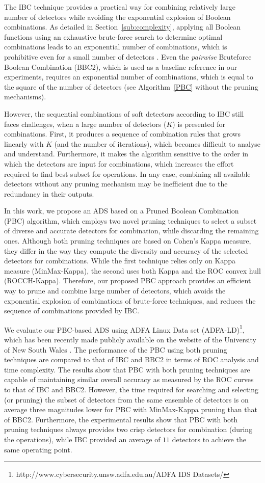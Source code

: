 The IBC technique provides a practical way for combining relatively large number of detectors while avoiding the exponential explosion of Boolean combinations.
As detailed in Section~\ref{sub:complexity}, applying all Boolean functions using an exhaustive brute-force search to determine optimal combinations leads to an exponential number of combinations, which is prohibitive even for a small number of detectors \cite{Barreno2008}.
Even the \textit{pairwise} Bruteforce Boolean Combination (BBC2), which is used as a baseline reference in our experiments, requires an exponential number of combinations, which is equal to the square of the number of detectors (see Algorithm~\ref{PBC} without the pruning mechanisms).

However, the sequential combinations of soft detectors according to IBC still faces challenges, when a large number of detectors ($K$) is presented for combinations.
First, it produces a sequence of combination rules that grows linearly with $K$ (and the number of iterations), which becomes difficult to analyse and understand.
Furthermore, it makes the algorithm sensitive to the order in which the detectors are input for combinations, which increases the effort required to find best subset for operations.
In any case, combining all available detectors without any pruning mechanism may be inefficient due to the redundancy in their outputs.

In this work, we propose an ADS based on a Pruned Boolean Combination (PBC) algorithm, which employs two novel pruning techniques to select a subset of diverse and accurate detectors for combination, while discarding the remaining ones.
Although both pruning techniques are based on Cohen's Kappa \cite{Cohen1995a} measure, they differ in the way they compute the diversity and accuracy of the selected detectors for combinations.
While the first technique relies only on Kappa measure (MinMax-Kappa), the second uses both Kappa and the ROC convex hull (ROCCH-Kappa).
Therefore, our proposed PBC approach provides an efficient way to prune and combine large number of detectors, which avoids the exponential explosion of combinations of brute-force techniques, and reduces the sequence of combinations provided by IBC.

We evaluate our PBC-based ADS using ADFA Linux Data set (ADFA-LD)\footnote{http://www.cybersecurity.unsw.adfa.edu.au/ADFA IDS Datasets/}, which has been recently made publicly available on the website of the University of New South Wales \cite{Creech2013a}.
The performance of the PBC using both pruning techniques are compared to that of IBC and BBC2 in terms of ROC analysis and time complexity.
The results show that PBC with both pruning techniques are capable of maintaining similar overall accuracy as measured by the ROC curves to that of IBC and BBC2.
However, the time required for searching and selecting (or pruning) the subset of detectors from the same ensemble of detectors is on average three magnitudes lower for PBC with MinMax-Kappa pruning than that of BBC2.
Furthermore, the experimental results show that PBC with both pruning techniques always provides two crisp detectors for combination (during the operations), while IBC provided an average of $11$ detectors to achieve the same operating point.


